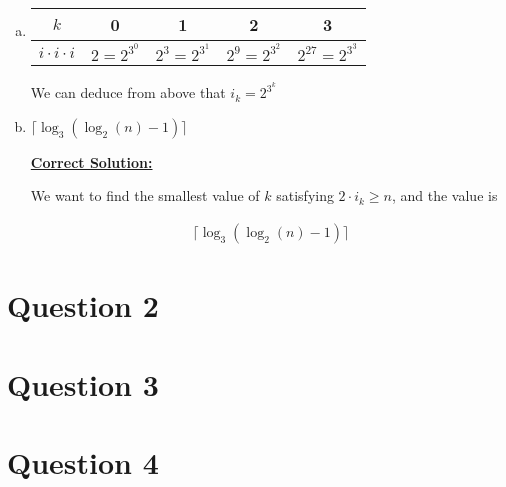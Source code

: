 \documentclass[12pt]{article}
\begin{document}
\begin{enumerate}[a.]
    \item

    \begin{tabular}{|c|c|c|c|c|}
        \hline
        $k$ & 0 & 1 & 2 & 3\\
        \hline
        $i \cdot i \cdot i$ & $2 = 2^{3^0}$ & $2^3 = 2^{3^1}$ & $2^9 = 2^{3^2}$ & $2^27 = 2^{3^3}$\\
        \hline
    \end{tabular}

    We can deduce from above that $i_k = 2^{3^k}$

    \item

    $\lceil \log_3 (\log_2 (n) - 1) \rceil$

    \newpage

    \begin{mdframed}
        \underline{\textbf{Correct Solution:}}

        \bigskip

        \color{red} We want to find the smallest value of $k$ satisfying $2 \cdot
        i_k \geq n$, and the value is\color{black}

        \begin{align*}
            \lceil \log_3 (\log_2 (n) - 1) \rceil
        \end{align*}
    \end{mdframed}

\end{enumerate}

\section*{Question 2}

\section*{Question 3}

\section*{Question 4}
\end{document}
